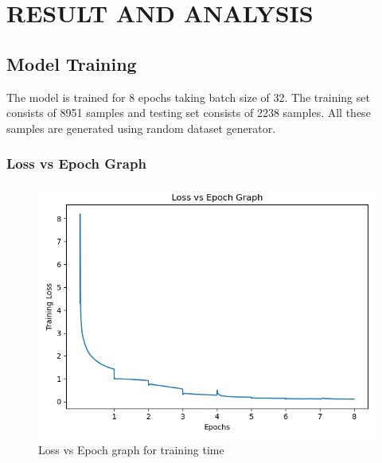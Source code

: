 \documentclass{ioereport}
\begin{document}
\section{\MakeUppercase{Result and Analysis}}





\subsection{Model Training}
The model is trained for 8 epochs taking batch size of 32. The training set consists of
8951 samples and testing set consists of 2238 samples. All these samples are generated
using random dataset generator.

\subsubsection{Loss vs Epoch Graph}
 \begin{figure}[H]
        \includegraphics[scale=1]{images/Training Loss.png}
        \caption{Loss vs Epoch graph for training time}
        \label{fig:lvsepocht}
    \end{figure}
\end{document}
